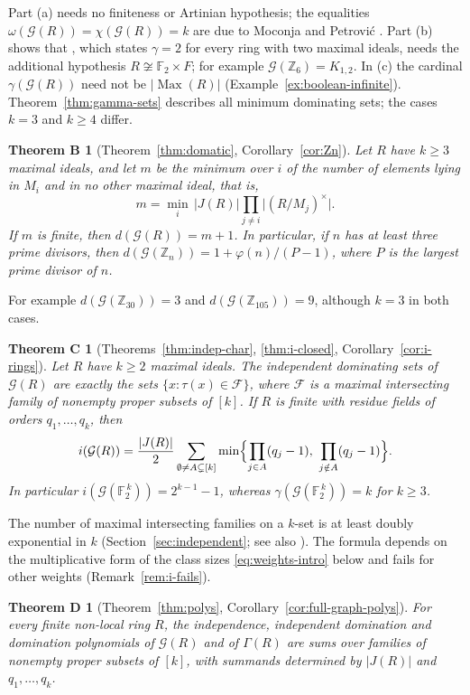 \documentclass[11pt]{amsart}
\newtheorem*{theoremB}{Theorem B}
\newtheorem*{theoremC}{Theorem C}
\newtheorem*{theoremD}{Theorem D}
\theoremstyle{definition}
\theoremstyle{remark}
\newcommand{\Max}{\operatorname{Max}}
\newcommand{\Jac}{J}
\newcommand{\G}{\mathcal{G}}
\newcommand{\F}{\mathcal{F}}
\newcommand{\Z}{\mathbb{Z}}
\newcommand{\FF}{\mathbb{F}}
\newcommand{\Bool}[1]{\FF_2^{\,#1}}
\begin{document}
Part (a) needs no finiteness or Artinian hypothesis; the equalities $\omega(\G(R))=\chi(\G(R))=k$
are due to Moconja and Petrovi\'c \cite{MP11}. Part (b) shows that \cite[Corollary~3]{SRD21}, which
states $\gamma=2$ for every ring with two maximal ideals, needs the additional hypothesis
$R\not\cong\FF_2\times F$; for example $\G(\Z_6)=K_{1,2}$. In (c) the cardinal $\gamma(\G(R))$ need not be $|\Max(R)|$
(Example~\ref{ex:boolean-infinite}). Theorem~\ref{thm:gamma-sets} describes all minimum dominating
sets; the cases $k=3$ and $k\ge4$ differ.

\begin{theoremB}[Theorem~\ref{thm:domatic}, Corollary~\ref{cor:Zn}]
Let $R$ have $k\ge3$ maximal ideals, and let $m$ be the minimum over $i$ of the number of elements
lying in $M_i$ and in no other maximal ideal, that is,
\[
  m=\min_i\, |\Jac(R)|\prod_{j\neq i}\bigl|(R/M_j)^{\times}\bigr| .
\]
If $m$ is finite, then $d(\G(R))=m+1$. In particular, if $n$ has at least three prime divisors, then
$d(\G(\Z_n))=1+\varphi(n)/(P-1)$, where $P$ is the largest prime divisor of $n$.
\end{theoremB}

For example $d(\G(\Z_{30}))=3$ and $d(\G(\Z_{105}))=9$, although $k=3$ in both cases.

\begin{theoremC}[Theorems~\ref{thm:indep-char}, \ref{thm:i-closed}, Corollary~\ref{cor:i-rings}]
Let $R$ have $k\ge2$ maximal ideals. The independent dominating sets of $\G(R)$ are exactly the
sets $\{x:\tau(x)\in\F\}$, where $\F$ is a maximal intersecting family of nonempty proper subsets
of $[k]$. If $R$ is finite with residue fields of orders $q_1,\dots,q_k$, then
\[
  i(\G(R)) = \frac{|\Jac(R)|}{2}\sum_{\emptyset\neq A\subsetneq[k]}
  \min\Bigl\{\prod_{j\in A}(q_j-1),\ \prod_{j\notin A}(q_j-1)\Bigr\}.
\]
In particular $i(\G(\Bool k))=2^{k-1}-1$, whereas $\gamma(\G(\Bool k))=k$ for $k\ge3$.
\end{theoremC}

The number of maximal intersecting families on a $k$-set is at least doubly exponential in $k$
(Section~\ref{sec:independent}; see also \cite{BMMV13}). The formula depends on the multiplicative form
of the class sizes \eqref{eq:weights-intro} below and fails for other weights
(Remark~\ref{rem:i-fails}).

\begin{theoremD}[Theorem~\ref{thm:polys}, Corollary~\ref{cor:full-graph-polys}]
For every finite non-local ring $R$, the independence, independent domination and domination
polynomials of $\G(R)$ and of $\Gamma(R)$ are sums over families of nonempty proper subsets of
$[k]$, with summands determined by $|\Jac(R)|$ and $q_1,\dots,q_k$.
\end{theoremD}
\end{document}
